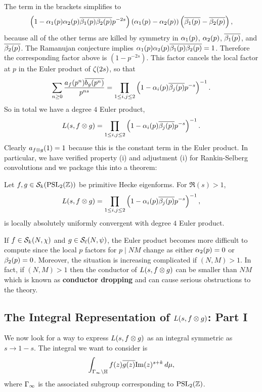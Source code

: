       \endgroup
      The term in the brackets simplifies to
      \[
        \left(1-\alpha_{1}(p)\alpha_{2}(p)\overline{\beta_{1}(p)}\overline{\beta_{2}(p)}p^{-2s}\right)(\alpha_{1}(p)-\alpha_{2}(p))\left(\overline{\beta_{1}(p)}-\overline{\beta_{2}(p)}\right),
      \]
      because all of the other terms are killed by symmetry in $\alpha_{1}(p)$, $\alpha_{2}(p)$, $\overline{\beta_{1}(p)}$, and $\overline{\beta_{2}(p)}$. The Ramanujan conjecture implies $\alpha_{1}(p)\alpha_{2}(p)\overline{\beta_{1}(p)}\overline{\beta_{2}(p)} = 1$. Therefore the corresponding factor above is $(1-p^{-2s})$. This factor cancels the local factor at $p$ in the Euler product of $\zeta(2s)$, so that
      \[
        \sum_{n \ge 0}\frac{a_{f}(p^{n})\overline{b_{g}(p^{n})}}{p^{ns}} = \prod_{1 \le i,j \le 2}\left(1-\alpha_{i}(p)\overline{\beta_{j}(p)}p^{-s}\right)^{-1}.
      \]
      So in total we have a degree $4$ Euler product,
      \[
        L(s,f \otimes g) = \prod_{1 \le i,j \le 2}\left(1-\alpha_{i}(p)\overline{\beta_{j}(p)}p^{-s}\right)^{-1}.
      \]
      Clearly $a_{f \otimes g}(1) = 1$ because this is the constant term in the Euler product. In particular, we have verified property (i) and adjustment (i) for Rankin-Selberg convolutions and we package this into a theorem:

      \begin{theorem}
        Let $f,g \in \mathcal{S}_{k}(\mathrm{PSL}_{2}(\mathbb{Z}))$ be primitive Hecke eigenforms. For $\Re(s) > 1$,
        \[
          L(s,f \otimes g) = \prod_{1 \le i,j \le 2}\left(1-\alpha_{i}(p)\overline{\beta_{j}(p)}p^{-s}\right)^{-1},
        \]
        is locally absolutely uniformly convergent with degree $4$ Euler product.
      \end{theorem}

      \begin{remark}
        If $f \in \mathcal{S}_{k}(N,\chi)$ and $g \in \mathcal{S}_{\ell}(N,\psi)$, the Euler product becomes more difficult to compute since the local $p$ factors for $p \mid NM$ change as either $\alpha_{2}(p) = 0$ or $\beta_{2}(p) = 0$. Moreover, the situation is increasing complicated if $(N,M) > 1$. In fact, if $(N,M) > 1$ then the conductor of $L(s,f \otimes g)$ can be smaller than $NM$ which is known as \textbf{conductor dropping} and can cause serious obstructions to the theory.
      \end{remark}
    \subsection*{The Integral Representation of \texorpdfstring{$L(s,f \otimes g)$}{L(s,f \ox g)}: Part I}
      We now look for a way to express $L(s,f \otimes g)$ as an integral symmetric as $s \to 1-s$. The integral we want to consider is
      \[
        \int_{\Gamma_{\infty}\backslash\mathbb{H}}f(z)\overline{g(z)}\mathrm{Im}(z)^{s+k}\,d\mu,
      \]
      where $\Gamma_{\infty}$ is the associated subgroup corresponding to $\mathrm{PSL}_{2}(\mathbb{Z})$.

